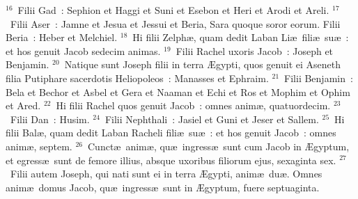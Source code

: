 ${}^{16}$~Filii Gad~: Sephion et Haggi et Suni et Esebon et Heri et Arodi et Areli.
${}^{17}$~Filii Aser~: Jamne et Jesua et Jessui et Beria, Sara quoque soror eorum. Filii Beria~: Heber et Melchiel.
${}^{18}$~Hi filii Zelph\ae , quam dedit Laban Li\ae\ fili\ae\ su\ae~: et hos genuit Jacob sedecim animas.
${}^{19}$~Filii Rachel uxoris Jacob~: Joseph et Benjamin.
${}^{20}$~Natique sunt Joseph filii in terra \AE gypti, quos genuit ei Aseneth filia Putiphare sacerdotis Heliopoleos~: Manasses et Ephraim.
${}^{21}$~Filii Benjamin~: Bela et Bechor et Asbel et Gera et Naaman et Echi et Ros et Mophim et Ophim et Ared.
${}^{22}$~Hi filii Rachel quos genuit Jacob~: omnes anim\ae , quatuordecim.
${}^{23}$~Filii Dan~: Husim.
${}^{24}$~Filii Nephthali~: Jasiel et Guni et Jeser et Sallem.
${}^{25}$~Hi filii Bal\ae , quam dedit Laban Racheli fili\ae\ su\ae~: et hos genuit Jacob~: omnes anim\ae , septem.
${}^{26}$~Cunct\ae\ anim\ae , qu\ae\ ingress\ae\ sunt cum Jacob in \AE gyptum, et egress\ae\ sunt de femore illius, absque uxoribus filiorum ejus, sexaginta sex.
${}^{27}$~Filii autem Joseph, qui nati sunt ei in terra \AE gypti, anim\ae\ du\ae . Omnes anim\ae\ domus Jacob, qu\ae\ ingress\ae\ sunt in \AE gyptum, fuere septuaginta.


